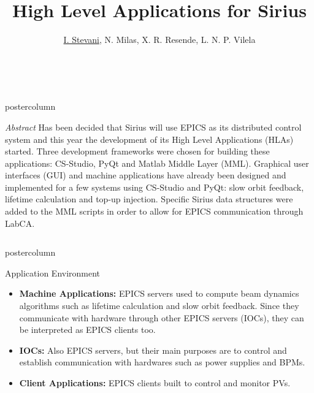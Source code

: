 \documentclass{beamer}
\title{\huge High Level Applications for Sirius}
\author{\underline{I. Stevani}, N. Milas, X. R. Resende, L. N. P. Vilela}
\institute{Brazilian Synchrotron Light Laboratory (LNLS), Campinas, Brazil}
\date{\monthname \ \the\year}
\newlength{\abstractheight}
\newlength{\columnheight}
\begin{document}
\begin{frame}
\begin{beamercolorbox}[center]{postercolumn}
	\begin{minipage}{\textwidth}
		\parbox[t][\abstractheight]{\textwidth}{
		\begin{myblock}{\textit{Abstract}}
			Has been decided that Sirius will use EPICS as its distributed control system and this year the development of its High Level Applications (HLAs) started. Three development frameworks were chosen for building these applications: CS-Studio, PyQt and Matlab Middle Layer (MML). Graphical user interfaces (GUI) and machine applications have already been designed and implemented for a few systems using CS-Studio and PyQt: slow orbit feedback, lifetime calculation and top-up injection. Specific Sirius data structures were added to the MML scripts in order to allow for EPICS communication through LabCA.
		\end{myblock}
	}\end{minipage}
\end{beamercolorbox}
\begin{columns}
	\begin{column}{0.45\textwidth}
		\begin{beamercolorbox}[center]{postercolumn}
			\begin{minipage}{.98\textwidth}  %
				\parbox[t][\columnheight]{\textwidth}{ %
					\begin{myblock}{Application Environment}
						\begin{itemize}
							\item \textbf{Machine Applications:} EPICS servers used to compute beam dynamics algorithms such as lifetime calculation and slow orbit feedback. Since they communicate with hardware through other EPICS servers (IOCs), they can be interpreted as EPICS clients too.
							\item \textbf{IOCs:} Also EPICS servers, but their main purposes are to control and establish communication with hardwares such as power supplies and BPMs.
							\item \textbf{Client Applications:} EPICS clients built to control and monitor PVs.
						\end{itemize}
						\begin{figure}
							\centering

\end{figure}
\end{myblock}}
\end{minipage}
\end{beamercolorbox}
\end{column}
\end{columns}
\end{frame}
\end{document}
